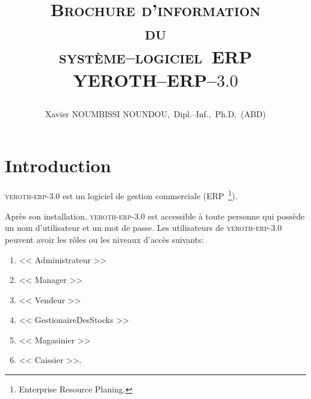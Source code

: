 \documentclass[a4paper, 10pt, twocolumn]{article}
\newcommand{\pos}{syst\`eme--logiciel~ERP\xspace}
\newcommand{\yerenpos}{\textcolor{yerenColorBlue}{\sc YEROTH--ERP--$3.0$}\xspace}
\newcommand{\myfullacademicname}{Xavier NOUMBISSI NOUNDOU,~Dipl.--Inf.,~Ph.D.~(ABD)\xspace}
\newcommand{\yeren}{\textsc{yeroth-erp-3.0}\xspace}
\newcommand{\manager}{<< Manager >>\xspace}
\newcommand{\caissier}{<< Caissier >>\xspace}
\newcommand{\administrateur}{<< Administrateur >>\xspace}
\newcommand{\magasinier}{<< Magasinier >>\xspace}
\newcommand{\vendeur}{<< Vendeur >>\xspace}
\newcommand{\gestionairedestocks}{<< GestionaireDesStocks >>\xspace}
\begin{document}

\title{
\vspace{-1.65em}
\textcolor{medgreen}{\textsc{Brochure d'information \\
										du \\
									 \pos \\ \vspace{1em}
									 \yerenpos}}
									 \author{\myfullacademicname}
}

\date{} 
\maketitle
\thispagestyle{fancy}



\vspace{-1.1em}
\section{Introduction}
\vspace{-0.3em}
\yeren est un logiciel de gestion commerciale
(ERP~\footnote{Enterprise Resource Planing.}).

Apr\`es son installation, \yeren est accessible \`a
toute personne qui poss\`ede un nom d'utilisateur et
un mot de passe.
Les utilisateurs de \yeren peuvent avoir les r\^oles ou 
les niveaux d'acc\`es suivants:
\begin{enumerate}[1)]
	\itemsep -0.6em
	\item \administrateur
	\item \manager
	\item \vendeur
	\item \gestionairedestocks
	\item \magasinier
	\item \caissier.
\end{enumerate}
\end{document}
